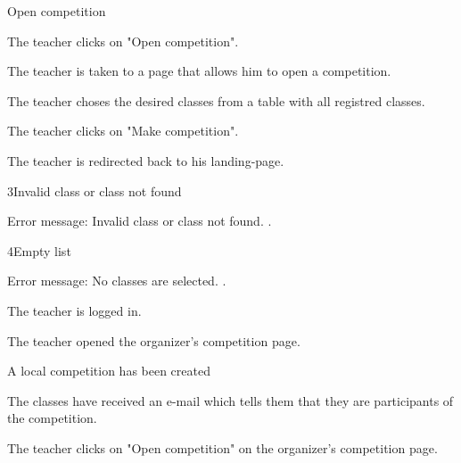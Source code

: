 \begin{uc}{Open competition}

    \begin{uc-mss}
    \item The teacher clicks on "Open competition".
    \item The teacher is taken to a page that allows him to open a competition.
    \item The teacher choses the desired classes from a table with all registred classes.
    \item The teacher clicks on "Make competition".
    \item The teacher is redirected back to his landing-page.
    \end{uc-mss}

    \begin{uc-ext}

        \begin{uc-fail}{3}{Invalid class or class not found}
        \item Error message: Invalid class or class not found.
            .
        \end{uc-fail}

        \begin{uc-fail}{4}{Empty list}
        \item Error message: No classes are selected.
            .
        \end{uc-fail}

    \end{uc-ext}

    \begin{uc-pre}
        \item The teacher is logged in.
        \item The teacher opened the organizer's competition page.
    \end{uc-pre}

    \begin{uc-post}
    \item A local competition has been created
    \item The classes have received an e-mail which tells them that they are participants of the competition.
    \end{uc-post}

    \begin{uc-trig}
        The teacher clicks on "Open competition" on the organizer's competition page.
    \end{uc-trig}

\end{uc}
